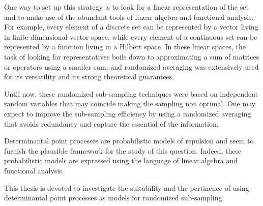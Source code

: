 \documentclass[twoside,11pt]{book}
\numberwithin{theorem}{chapter}
\numberwithin{definition}{chapter}
\numberwithin{proposition}{chapter}
\numberwithin{corollary}{chapter}
\numberwithin{example}{chapter}
\numberwithin{lemma}{chapter}
\numberwithin{assumption}{chapter}
\numberwithin{equation}{chapter}
\numberwithin{figure}{chapter}
\begin{document}
One way to set up this strategy is to look for a linear representation of the set and to make use of the abundant tools of linear algebra and functional analysis. For example, every element of a discrete set can be represented by a vector living in finite dimensional vector space, while every element of a continuous set can be represented by a function living in a Hilbert space. In these linear spaces, the task of looking for representatives boils down to approximating a sum of matrices or operators using a smaller sum; and randomized averaging was extensively used for its versatility and its strong theoretical guarantees. 


Until now, these randomized sub-sampling techniques were based on independent random variables that may coincide making the sampling non optimal. One may expect to improve the sub-sampling efficiency by using a randomized averaging that avoids redundancy and capture the essential of the information.


Determinantal point processes are probabilistic models of repulsion and seem to furnish the plausible framework for the study of this question. Indeed, these probabilistic models are expressed using the language of linear algebra and functional analysis.



This thesis is devoted to investigate the suitability and the pertinence of using determinantal point processes as models for randomized sub-sampling.




\end{document}
